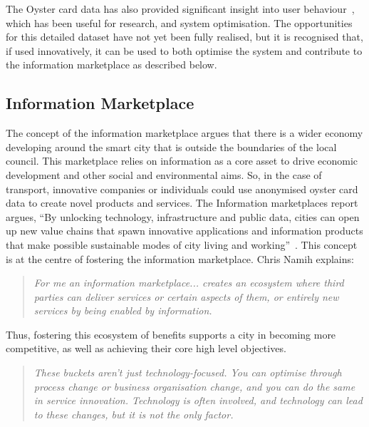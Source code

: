 \documentclass[conference]{IEEEtran}
\begin{document}
The Oyster card data has also provided significant insight into user
behaviour~\cite{reades:2011}, which has been useful for research, and
system optimisation. The opportunities for this detailed dataset have
not yet been fully realised, but it is recognised that, if used
innovatively, it can be used to both optimise the system and
contribute to the information marketplace as described below.

\subsection{Information Marketplace}
The concept of the information marketplace argues that there is a
wider economy developing around the smart city that is outside the
boundaries of the local council. This marketplace relies on
information as a core asset to drive economic development and other
social and environmental aims. So, in the case of transport,
innovative companies or individuals could use anonymised oyster card
data to create novel products and services. The Information
marketplaces report argues, ``By unlocking technology, infrastructure
and public data, cities can open up new value chains that spawn
innovative applications and information products that make possible
sustainable modes of city living and
working''~\cite{arup-et-al:2011}. This concept is at the centre of
fostering the information marketplace. Chris Namih explains:

\begin{quote}
{\emph{For me an information marketplace... creates an ecosystem where third
parties can deliver services or certain aspects of them, or entirely
new services by being enabled by information.}}~\cite{namih:2012}
\end{quote}

Thus, fostering this ecosystem of benefits supports a city
in becoming more competitive, as well as achieving their core high
level objectives.


\begin{quote}
{\emph{These buckets aren’t just technology-focused. You can optimise
through process change or business organisation change, and you can do
the same in service innovation. Technology is often involved, and
technology can lead to these changes, but it is not the only factor.}}~\cite{namih:2012}
\end{quote}
\end{document}
